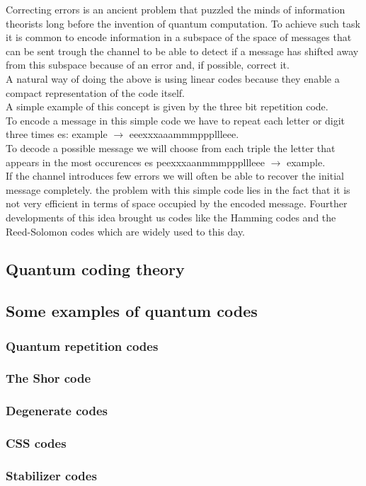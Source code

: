 \documentclass{article}
\begin{document}
Correcting errors is an ancient problem that puzzled the minds of
information theorists long before the invention of quantum computation.
To achieve such task it is common to encode information in a subspace of
the space of messages that can be sent trough the channel to be able to
detect if a message has shifted away from this subspace because of an
error and, if possible, correct it.\\
A natural way of doing the above is using linear codes because they
enable a compact representation of the code itself.\\
A simple example of this concept is given by the three bit repetition
code.\\
To encode a message in this simple code we have to repeat each letter
or digit three times es: example $\rightarrow$ eeexxxaaammmpppllleee.\\
To decode a possible message we will choose from each triple the
letter that appears in the most occurences es peexxxaanmmmpppllleee $\rightarrow$ example. \\
If the channel introduces few errors we will often be able to recover
the initial message completely.
the problem with this simple code lies in the fact that it is not very
efficient in terms of space occupied by the encoded message.
Fourther developments of this idea brought us codes like the Hamming
codes and the Reed-Solomon codes which are widely used to this day.




\subsection{Quantum coding theory}

\subsection{Some examples of quantum codes}

\subsubsection{Quantum repetition codes}

\subsubsection{The Shor code}

\subsubsection{Degenerate codes}

\subsubsection{CSS codes}

\subsubsection{Stabilizer codes}
\end{document}
